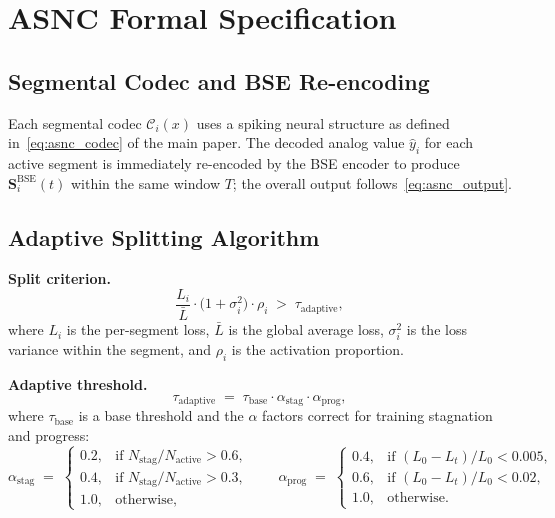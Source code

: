 \documentclass{article}
\theoremstyle{plain}
\theoremstyle{definition}
\theoremstyle{remark}
\begin{document}
\section{ASNC Formal Specification}
\label{app:asnc_details}

\subsection{Segmental Codec and BSE Re-encoding}

Each segmental codec $\mathcal{C}_i(x)$ uses a spiking neural structure as defined
in~\eqref{eq:asnc_codec} of the main paper. The decoded analog value $\hat{y}_i$ for
each active segment is immediately re-encoded by the BSE encoder to produce
$\mathbf{S}^{\mathrm{BSE}}_i(t)$ within the same window $T$; the overall output
follows~\eqref{eq:asnc_output}.

\subsection{Adaptive Splitting Algorithm}

\noindent\textbf{Split criterion.}
\begin{equation}
\frac{L_i}{\bar{L}} \cdot \big(1 + \sigma_i^2\big) \cdot \rho_i
\;>\; \tau_{\mathrm{adaptive}},
\end{equation}
where $L_i$ is the per-segment loss, $\bar{L}$ is the global average loss,
$\sigma_i^2$ is the loss variance within the segment, and $\rho_i$ is the activation
proportion.

\noindent\textbf{Adaptive threshold.}
\begin{equation}
\tau_{\mathrm{adaptive}}
\;=\; \tau_{\mathrm{base}} \cdot \alpha_{\mathrm{stag}} \cdot \alpha_{\mathrm{prog}},
\end{equation}
where $\tau_{\mathrm{base}}$ is a base threshold and the $\alpha$ factors correct for
training stagnation and progress:
\begin{equation}
\alpha_{\mathrm{stag}} \;=\;
\begin{cases}
0.2, & \text{if } N_{\mathrm{stag}}/N_{\mathrm{active}} > 0.6,\\
0.4, & \text{if } N_{\mathrm{stag}}/N_{\mathrm{active}} > 0.3,\\
1.0, & \text{otherwise,}
\end{cases}
\qquad
\alpha_{\mathrm{prog}} \;=\;
\begin{cases}
0.4, & \text{if } (L_0-L_t)/L_0 < 0.005,\\
0.6, & \text{if } (L_0-L_t)/L_0 < 0.02,\\
1.0, & \text{otherwise.}
\end{cases}
\end{equation}
\end{document}
